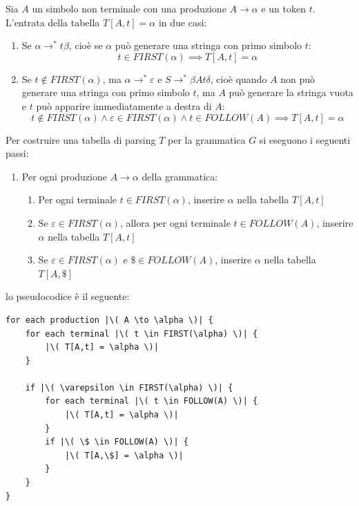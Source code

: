 \documentclass[a4paper]{article}
\begin{document}
\vspace{1em}
\noindent
\begin{definition}
  Sia \( A \) un simbolo non terminale con una produzione \( A \to \alpha \) e un
  token \( t \). L'entrata della tabella \( T[A,t] = \alpha \) in due casi:
  \begin{enumerate}
    \item Se \( \alpha \to^* t \beta \), cioè se \( \alpha \) può generare una stringa
      con primo simbolo \( t \):
      \[
        t \in FIRST(\alpha) \implies T[A,t] = \alpha
      \] 

    \item Se \( t \notin FIRST(\alpha) \), ma \( \alpha \to^* \varepsilon \) e
      \( S \to^* \beta A t \delta \), cioè quando \( A \) non può generare una stringa
      con primo simbolo \( t \), ma \( A \) può generare la stringa vuota e \( t \)
      può apparire immediatamente a destra di \( A \):
      \[
        t \notin FIRST(\alpha) \land \varepsilon \in FIRST(\alpha) \land t \in FOLLOW(A)
        \implies T[A,t] = \alpha
      \] 
  \end{enumerate}
\end{definition}

\noindent
Per costruire una tabella di parsing \( T \) per la grammatica \( G \) si eseguono i
seguenti passi:
\begin{enumerate}
  \item Per ogni produzione \( A \to \alpha \) della grammatica:
    \begin{enumerate}
      \item Per ogni terminale \( t \in FIRST(\alpha) \), inserire \( \alpha \) nella
        tabella \( T[A,t] \)
      \item Se \( \varepsilon \in FIRST(\alpha) \), allora per ogni terminale
        \( t \in FOLLOW(A) \), inserire \( \alpha \) nella tabella \( T[A,t] \)
      \item Se \( \varepsilon \in FIRST(\alpha) \) e \( \$ \in FOLLOW(A) \), inserire
        \( \alpha \) nella tabella \( T[A,\$] \)
    \end{enumerate}
\end{enumerate}

lo pseudocodice è il seguente:
\begin{lstlisting}[escapechar=|, basicstyle=\rmfamily, columns=fullflexible, keepspaces=true]
for each production |\( A \to \alpha \)| {
    for each terminal |\( t \in FIRST(\alpha) \)| {
        |\( T[A,t] = \alpha \)|
    }

    if |\( \varepsilon \in FIRST(\alpha) \)| {
        for each terminal |\( t \in FOLLOW(A) \)| {
            |\( T[A,t] = \alpha \)|
        }
        if |\( \$ \in FOLLOW(A) \)| {
            |\( T[A,\$] = \alpha \)|
        }
    }
}
\end{lstlisting}
\end{document}
